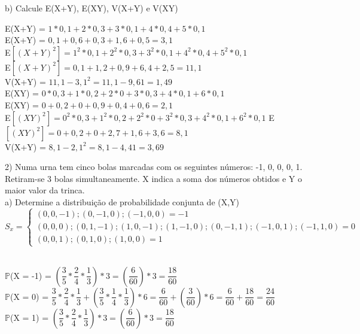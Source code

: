 \documentclass[12pt,a4paper,draft,final,oneside]{article}
\begin{document}
	\vspace{1cm}
	b) Calcule E(X+Y), E(XY), V(X+Y) e V(XY)
	\vspace{0.5cm}\\
	\begin{center}
		E(X+Y) = $1*0,1 + 2*0,3 + 3*0,1 + 4*0,4 + 5*0,1$ 
		\vspace{0.25cm}\\
		E(X+Y) = $0,1 + 0,6 + 0,3 + 1,6 + 0,5 = 3,1$
		\vspace{1cm}\\
		E$[(X+Y)^2] = 1^2*0,1 + 2^2*0,3 + 3^2*0,1 + 4^2*0,4 + 5^2*0,1$
		\vspace{0.25cm}\\
		E$[(X+Y)^2] = 0,1 + 1,2 + 0,9 + 6,4 + 2,5 = 11,1$	
		\vspace{1cm}\\
		V(X+Y) = $11,1 - 3,1^2 = 11,1 - 9,61 = 1,49$
		\vspace{1cm}\\
		E(XY) = $0*0,3 + 1*0,2 + 2*0 + 3*0,3 + 4*0,1 + 6*0,1$
		\vspace{0.25cm}\\
		E(XY) = $0 + 0,2 + 0 + 0,9 + 0,4 + 0,6 = 2,1$
		\vspace{1cm}\\
		E$[(XY)^2] = 0^2*0,3 + 1^2*0,2 + 2^2*0 + 3^2*0,3 + 4^2*0,1 + 6^2*0,1$
		\vspace{0.25cm}
		E$[(XY)^2] = 0 + 0,2 + 0 + 2,7 + 1,6 + 3,6 = 8,1$
		\vspace{1cm}\\
		V(X+Y) = $8,1 - 2,1^2 = 8,1 - 4,41 = 3,69$
	\end{center}
	\vspace{1cm}
	2) Numa urna tem cinco bolas marcadas com os seguintes números: -1, 0, 0, 0, 1.	Retiram-se 3 bolas simultaneamente. X indica a soma dos números obtidos e Y o maior valor da trinca.\\
	a) Determine a distribuição de probabilidade conjunta de (X,Y)
	\vspace{0.5cm}\\
	\[
	S_{x} =
	\begin{cases}
	(0, 0, -1); (0, -1, 0); (-1, 0, 0) = -1 \\
	(0, 0, 0);(0, 1, -1); (1, 0, -1); (1, -1, 0); (0, -1, 1); (-1, 0, 1); (-1, 1, 0) = 0\\
	(0, 0, 1); (0, 1, 0); (1, 0, 0) = 1
	\end{cases}
	\]
	\vspace{0.5cm}\\
	\begin{center}
		$\mathbb{P}$(X = -1) = $(\dfrac{3}{5}*\dfrac{2}{4}*\dfrac{1}{3})*3 = (\dfrac{6}{60})*3 = \dfrac{18}{60}$
		\vspace{0.5cm}\\
		$\mathbb{P}$(X = 0) = $\dfrac{3}{5}*\dfrac{2}{4}*\dfrac{1}{3} + (\dfrac{3}{5}*\dfrac{1}{4}*\dfrac{1}{3})*6 = \dfrac{6}{60} + (\dfrac{3}{60})*6 = \dfrac{6}{60} + \dfrac{18}{60} = \dfrac{24}{60}$
		\vspace{0.5cm}\\
		$\mathbb{P}$(X = 1) = $(\dfrac{3}{5}*\dfrac{2}{4}*\dfrac{1}{3})*3 = (\dfrac{6}{60})*3 = \dfrac{18}{60}$
	\end{center}
\end{document}
